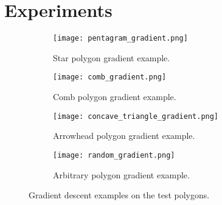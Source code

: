 \section{Experiments}
\label{sec:experiments}


\begin{figure}[h!]
    \centering
    \begin{subfigure}{0.45\textwidth}
        \centering
        \texttt{[image: pentagram\_gradient.png]}
        \caption{Star polygon gradient example.}
        \label{fig:star_gradient}
    \end{subfigure}
    \begin{subfigure}{0.45\textwidth}
        \centering
        \texttt{[image: comb\_gradient.png]}
        \caption{Comb polygon gradient example.}
        \label{fig:comb_gradient}
    \end{subfigure}
    \begin{subfigure}{0.45\textwidth}
        \centering
        \texttt{[image: concave\_triangle\_gradient.png]}
        \caption{Arrowhead polygon gradient example.}
        \label{fig:concave_gradient}
    \end{subfigure}
    \begin{subfigure}{0.45\textwidth}
        \centering
        \texttt{[image: random\_gradient.png]}
        \caption{Arbitrary polygon gradient example.}
        \label{fig:random_gradient}
    \end{subfigure}
    \caption{Gradient descent examples on the test polygons.}
\end{figure}